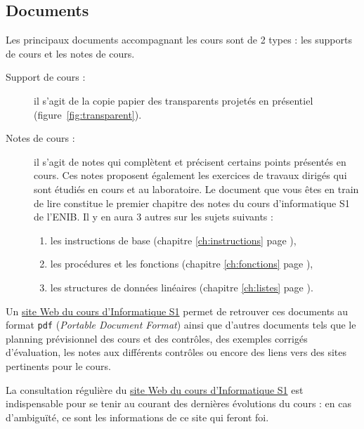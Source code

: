 \subsection{Documents}
Les principaux documents accompagnant les cours sont de 2 types : 
les supports de cours et les notes de cours.
\begin{description}
\item[Support de cours :] \mbox{}
	il s'agit de la copie papier des transparents projetés
	en présentiel (figu\-re~\ref{fig:transparent}). 
\item[Notes de cours :] il s'agit de notes qui complètent et
	précisent certains points présentés en cours. Ces notes proposent
	également les exercices de travaux dirigés qui sont étudiés
	en cours et au laboratoire. Le document que vous 
	êtes en train de lire constitue le premier chapitre des notes du cours
	d'informatique S1 de l'ENIB. Il y en aura 3 autres 
	sur les sujets suivants :
	\begin{enumerate}
	\item les instructions de base (chapitre \ref{ch:instructions} page \pageref{ch:instructions}),
	\item les procédures et les fonctions (chapitre \ref{ch:fonctions} page \pageref{ch:fonctions}),
	\item les structures de données linéaires (chapitre \ref{ch:listes} page \pageref{ch:listes}).
	\end{enumerate}
\end{description}

Un \href{https://moodle.enib.fr/course/view.php?id=24}{site {\sc Web} du cours d'Informatique S1} permet de retrouver ces documents au format {\tt pdf} 
({\em Portable Document Format}) ainsi que d'autres documents tels que
le planning prévisionnel des cours et des contrôles, des exemples corrigés 
d'évaluation, les notes aux différents contrôles ou encore des liens vers 
des sites pertinents pour le cours. 

La consultation régulière du 
\href{https://moodle.enib.fr/course/view.php?id=24}{site {\sc Web} du cours d'Informatique S1} 
est indispensable pour se tenir au courant des dernières évolutions du cours : en cas d'ambiguïté,
ce sont les informations de ce site qui feront foi.



